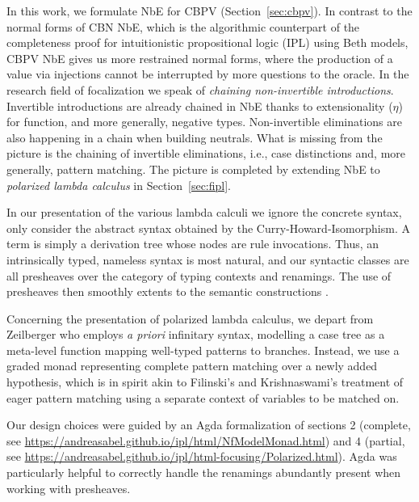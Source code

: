 \documentclass[sigplan,screen,fleqn,review]{acmart} %
\begin{document}
In this work, we formulate NbE for CBPV
(Section~\ref{sec:cbpv}).
%
In contrast to the normal forms of CBN NbE, which is the algorithmic
counterpart of the completeness proof for intuitionistic propositional
logic (IPL) using Beth models, CBPV NbE gives us more restrained
normal forms, where the production of a value via injections cannot be
interrupted by more questions to the oracle.  In the research field of
focalization \cite{andreoli:focusing,liangMiller:csl07} we speak of
\emph{chaining non-invertible introductions}.
Invertible introductions are already chained in NbE thanks to
extensionality ($\eta$) for function, and more generally, negative
types.  Non-invertible eliminations are also happening in a chain when
building neutrals.  What is missing from the picture is the chaining
of invertible eliminations, i.e., case distinctions and, more
generally, pattern matching.  The picture is completed by extending
NbE to \emph{polarized lambda calculus}
\cite{zeilberger:PhD,brockNannestadSchuermann:lpar10,espiritoSanto:entcs17}
in Section~\ref{sec:fipl}.


In our presentation of the various lambda calculi we ignore the
concrete syntax, only consider the abstract syntax obtained by the
Curry-Howard-Isomorphism.  A term is simply a derivation tree whose
nodes are rule invocations.  Thus, an intrinsically typed,
nameless syntax is most natural,
and our syntactic classes are all presheaves over the category of
typing contexts and renamings.  The use of presheaves then smoothly
extents to the semantic constructions
\cite{catarina:csl93,altenkirchHofmannStreicher:ctcs95}.

Concerning the presentation of polarized lambda calculus, we depart from
Zeilberger \cite{zeilberger:PhD} who employs \emph{a priori}
infinitary syntax, modelling a case tree as a meta-level function mapping
well-typed patterns to branches.  Instead, we use a graded monad
representing complete pattern matching over a newly added hypothesis,
which is in spirit akin to Filinski's \cite[Section~4]{filinski:tlca01}
and Krishnaswami's \cite{krishnaswami:popl09} treatment of eager
pattern matching using a separate context of variables to be matched
on.

Our design choices were guided by an Agda formalization of sections 2
(complete, see \url{https://andreasabel.github.io/ipl/html/NfModelMonad.html})
and 4 (partial, see \url{https://andreasabel.github.io/ipl/html-focusing/Polarized.html}).
Agda was particularly helpful to correctly handle the renamings
abundantly present when working with presheaves.
\end{document}
